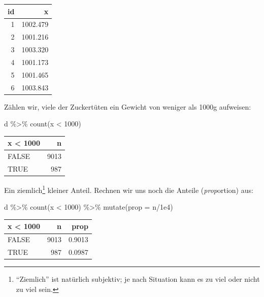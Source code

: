 \documentclass[
  a4paper,
  DIV=11]{scrreprt}
\newenvironment{Shaded}{\begin{snugshade}}{\end{snugshade}}
\newcommand{\AttributeTok}[1]{\textcolor[rgb]{0.40,0.45,0.13}{#1}}
\newcommand{\DecValTok}[1]{\textcolor[rgb]{0.68,0.00,0.00}{#1}}
\newcommand{\FloatTok}[1]{\textcolor[rgb]{0.68,0.00,0.00}{#1}}
\newcommand{\FunctionTok}[1]{\textcolor[rgb]{0.28,0.35,0.67}{#1}}
\newcommand{\NormalTok}[1]{\textcolor[rgb]{0.00,0.23,0.31}{#1}}
\newcommand{\SpecialCharTok}[1]{\textcolor[rgb]{0.37,0.37,0.37}{#1}}
\theoremstyle{definition}
\theoremstyle{remark}
\begin{document}
\begin{longtable}[]{@{}rr@{}}
\toprule()
id & x \\
\midrule()
\endhead
1 & 1002.479 \\
2 & 1001.216 \\
3 & 1003.320 \\
4 & 1001.173 \\
5 & 1001.465 \\
6 & 1003.843 \\
\bottomrule()
\end{longtable}

Zählen wir, viele der Zuckertüten ein Gewicht von weniger als 1000g
aufweisen:

\begin{Shaded}
\begin{Highlighting}[]
\NormalTok{d }\SpecialCharTok{\%\textgreater{}\%} 
  \FunctionTok{count}\NormalTok{(x }\SpecialCharTok{\textless{}} \DecValTok{1000}\NormalTok{)}
\end{Highlighting}
\end{Shaded}

\begin{longtable}[]{@{}lr@{}}
\toprule()
x \textless{} 1000 & n \\
\midrule()
\endhead
FALSE & 9013 \\
TRUE & 987 \\
\bottomrule()
\end{longtable}

Ein ziemlich\footnote{``Ziemlich'' ist natürlich subjektiv; je nach
  Situation kann es zu viel oder nicht zu viel sein.} kleiner Anteil.
Rechnen wir uns noch die Anteile (\emph{prop}ortion) aus:

\begin{Shaded}
\begin{Highlighting}[]
\NormalTok{d }\SpecialCharTok{\%\textgreater{}\%} 
  \FunctionTok{count}\NormalTok{(x }\SpecialCharTok{\textless{}} \DecValTok{1000}\NormalTok{) }\SpecialCharTok{\%\textgreater{}\%} 
  \FunctionTok{mutate}\NormalTok{(}\AttributeTok{prop =}\NormalTok{ n}\SpecialCharTok{/}\FloatTok{1e4}\NormalTok{)}
\end{Highlighting}
\end{Shaded}

\begin{longtable}[]{@{}lrr@{}}
\toprule()
x \textless{} 1000 & n & prop \\
\midrule()
\endhead
FALSE & 9013 & 0.9013 \\
TRUE & 987 & 0.0987 \\
\bottomrule()
\end{longtable}
\end{document}
